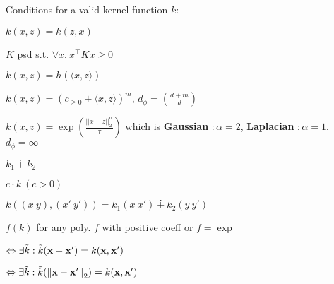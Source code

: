 Conditions for a valid kernel function \(k\): \\
\begin{itemize*}
  \item \(k(x, z) = k(z, x)\)
  \item \(K\) psd s.t. \(\forall x. \ x^\top K x \geq 0 \)
\end{itemize*}

\begin{definition}
  \(k(x, z) = h(\langle x, z \rangle)\)
\end{definition}

\begin{definition}
  \(k(x, z) = (c_{\geq 0} + \langle x, z \rangle)^m\), \(d_\phi = \binom{d + m}{d}\)
\end{definition}

\begin{definition}
  \(k(x, z)  = \exp\left(\frac{||x - z||_2^\alpha}{\tau}\right)\) which is \textbf{Gaussian} \(: \alpha = 2\), \textbf{Laplacian} \(: \alpha = 1\). \(d_\phi = \infty\)
\end{definition}

\begin{definition}
  \begin{itemize*}
    \item \(k_1 \dotplus k_2\)
    \item \(c\cdot k \ (c >0)\)
    \item \(k((x \ y), (x' \ y')) = k_1(x \ x') \dotplus k_2(y \ y') \)
    \item \(f(k)\) for any poly. \(f\) with positive coeff or \(f = \exp\)
  \end{itemize*}
\end{definition}

\begin{definition}[Stationary]
  \(\Leftrightarrow \exists \tilde k: \tilde k (\vb{x} - \vb{x}') = k(\vb{x}, \vb{x}')\)
\end{definition}

\begin{definition}[Isotropic]
  \(\Leftrightarrow \exists \tilde k: \tilde k (\norm{\vb{x} - \vb{x}'}_2) = k(\vb{x}, \vb{x}')\)
\end{definition}

